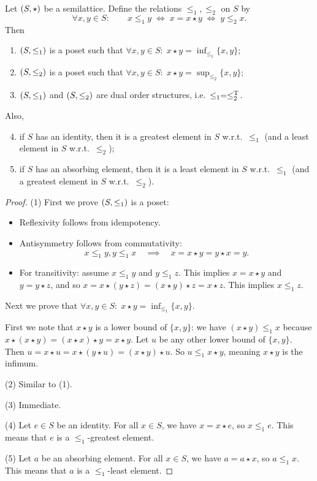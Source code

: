 \begin{proposition} \label{orderSemilattice}
Let $\sSet{S,\star}$ be a semilattice. Define the relations $\leq_1, \leq_2$ on $S$ by
\[ \forall x,y\in S:\qquad x\leq_1 y \; \iff \; x = x\star y \;\iff\; y\leq_2 x. \] 
Then
\begin{enumerate}
\item $\sSet{S,\leq_1}$ is a poset such that $\forall x,y\in S:\; x\star y = \inf_{\leq_1}\{x,y\}$;
\item $\sSet{S,\leq_2}$ is a poset such that $\forall x,y\in S:\; x\star y = \sup_{\leq_2}\{x,y\}$;
\item $\sSet{S,\leq_1}$ and $\sSet{S,\leq_2}$ are dual order structures, i.e.\ $\leq_1 = \leq_2^{\mathrm{T}}$.
\end{enumerate}
Also,
\begin{enumerate} \setcounter{enumi}{3}
\item if $S$ has an identity, then it is a greatest element in $S$ w.r.t.\ $\leq_1$ (and a least element in $S$ w.r.t.\ $\leq_2$);
\item if $S$ has an absorbing element, then it is a least element in $S$ w.r.t.\ $\leq_1$ (and a greatest element in $S$ w.r.t.\ $\leq_2$).
\end{enumerate}
\end{proposition}
\begin{proof}
(1) First we prove $\sSet{S,\leq_1}$ is a poset:
\begin{itemize}
\item Reflexivity follows from idempotency.
\item Antisymmetry follows from commutativity:
\[ x\leq_1 y, y\leq_1 x \quad\implies\quad x = x\star y = y \star x = y. \]
\item For transitivity: assume $x\leq_1 y$ and $y\leq_1 z$. This implies $x = x\star y$ and $y = y\star z$, and so $x = x\star (y\star z) = (x\star y) \star z = x\star z$. This implies $x\leq_1 z$.
\end{itemize}
Next we prove that $\forall x,y\in S:\; x\star y = \inf_{\leq_1}\{x,y\}$.

First we note that $x \star y$ is a lower bound of $\{x,y\}$: we have $(x\star y) \leq_1 x$ because $x\star(x\star y) = (x\star x)\star y = x\star y$. Let $u$ be any other lower bound of $\{x,y\}$. Then $u = x\star u = x\star (y\star u) = (x\star y)\star u$. So $u \leq_1 x\star y$, meaning $x\star y$ is the infimum.

(2) Similar to (1).

(3) Immediate.

(4) Let $e\in S$ be an identity. For all $x\in S$, we have $x = x\star e$, so $x\leq_1 e$. This means that $e$ is a $\leq_1$-greatest element.

(5) Let $a$ be an absorbing element. For all $x\in S$, we have $a = a\star x$, so $a\leq_1 x$. This means that $a$ is a $\leq_1$-least element.
\end{proof}

